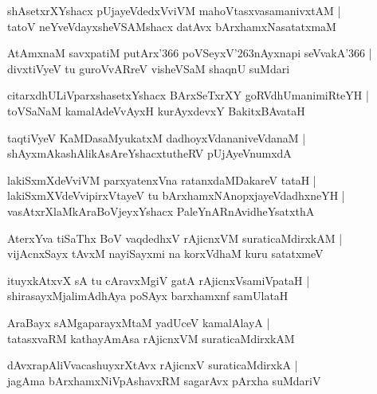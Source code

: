 \begin{shloka}
shAsetxrXYshacx pUjayeVdedxVviVM mahoVtasxvasamanivxtAM |\\
tatoV neYveVdayxsheVSAMshacx datAvx bArxhamxNasatatxmaM
\end{shloka}

\begin{shloka}
AtAmxnaM savxpatiM putArx\char'366 poVSeyxV\char'263nAyxnapi seVvakA\char'366 |\\
divxtiVyeV tu guroVvARreV visheVSaM shaqnU suMdari
\end{shloka}

\begin{shloka}
citarxdhULiVparxshasetxYshacx BArxSeTxrXY goRVdhUmanimiRteYH |\\
toVSaNaM kamalAdeVvAyxH kurAyxdevxY BakitxBAvataH
\end{shloka}

\begin{shloka}
taqtiVyeV KaMDasaMyukatxM dadhoyxVdananiveVdanaM |\\
shAyxmAkashAlikAsAreYshacxtutheRV pUjAyeVnumxdA 
\end{shloka}

\begin{shloka}
lakiSxmXdeVviVM parxyatenxVna ratanxdaMDakareV tataH |\\
lakiSxmXVdeVvipirxVtayeV tu bArxhamxNAnopxjayeVdadhxneYH |\\
vasAtxrXlaMkAraBoVjeyxYshacx PaleYnARnAvidheYsatxthA
\end{shloka}

\begin{shloka}
AterxYva tiSaThx BoV vaqdedhxV rAjicnxVM suraticaMdirxkAM |\\
vijAcnxSayx tAvxM nayiSayxmi na korxVdhaM kuru satatxmeV 
\end{shloka}

\begin{shloka}
ituyxkAtxvX sA tu cAravxMgiV gatA rAjicnxVsamiVpataH |\\
shirasayxMjalimAdhAya poSAyx barxhamxnf samUlataH
\end{shloka}

\begin{shloka}
AraBayx sAMgaparayxMtaM yadUceV kamalAlayA |\\
tatasxvaRM kathayAmAsa rAjicnxVM suraticaMdirxkAM
\end{shloka}

\begin{shloka}
dAvxrapAliVvacashuyxrXtAvx rAjicnxV suraticaMdirxkA |\\
jagAma bArxhamxNiVpAshavxRM sagarAvx pArxha suMdariV
\end{shloka}

